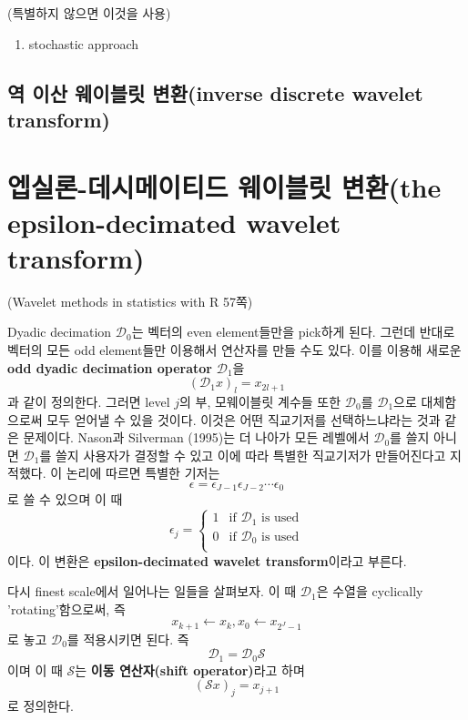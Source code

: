 \documentclass[b5paper,]{scrbook}
\providecommand{\tightlist}{%
  \setlength{\itemsep}{0pt}\setlength{\parskip}{0pt}}
\theoremstyle{plain}
\theoremstyle{definition}
\numberwithin{equation}{section}
\begin{document}
(특별하지 않으면 이것을 사용)

\begin{enumerate}
\def\labelenumi{\arabic{enumi}.}
\setcounter{enumi}{1}
\tightlist
\item
  stochastic approach
\end{enumerate}

\hypertarget{---inverse-discrete-wavelet-transform}{%
\subsection{역 이산 웨이블릿 변환(inverse discrete wavelet transform)}\label{---inverse-discrete-wavelet-transform}}

\hypertarget{---the-epsilon-decimated-wavelet-transform}{%
\section{엡실론-데시메이티드 웨이블릿 변환(the epsilon-decimated wavelet transform)}\label{---the-epsilon-decimated-wavelet-transform}}

(Wavelet methods in statistics with R 57쪽)

Dyadic decimation \(\mathcal{D}_{0}\)는 벡터의 even element들만을 pick하게 된다. 그런데 반대로 벡터의 모든 odd element들만 이용해서 연산자를 만들 수도 있다. 이를 이용해 새로운 \textbf{odd dyadic decimation operator} \(\mathcal{D}_{1}\)을
\[(\mathcal{D}_{1}x)_{l}=x_{2l+1}\]
과 같이 정의한다. 그러면 level \(j\)의 부, 모웨이블릿 계수들 또한 \(\mathcal{D}_{0}\)를 \(\mathcal{D}_{1}\)으로 대체함으로써 모두 얻어낼 수 있을 것이다. 이것은 어떤 직교기저를 선택하느냐라는 것과 같은 문제이다. Nason과 Silverman (1995)는 더 나아가 모든 레벨에서 \(\mathcal{D}_{0}\)를 쓸지 아니면 \(\mathcal{D}_{1}\)를 쓸지 사용자가 결정할 수 있고 이에 따라 특별한 직교기저가 만들어진다고 지적했다. 이 논리에 따르면 특별한 기저는
\[\epsilon=\epsilon_{J-1}\epsilon_{J-2}\cdots\epsilon_{0}\]
로 쓸 수 있으며 이 때
\[
\epsilon_{j} = 
\begin{cases}
1 & \text{if $\mathcal{D}_{1}$ is used} \\
0 & \text{if $\mathcal{D}_{0}$ is used}\\
\end{cases}
\]
이다. 이 변환은 \textbf{epsilon-decimated wavelet transform}이라고 부른다.

다시 finest scale에서 일어나는 일들을 살펴보자. 이 때 \(\mathcal{D}_{1}\)은 수열을 cyclically 'rotating'함으로써, 즉
\[x_{k+1} \leftarrow x_{k}, x_{0} \leftarrow x_{2^{J}-1}\]
로 놓고 \(\mathcal{D}_{0}\)를 적용시키면 된다. 즉
\[\mathcal{D}_{1}=\mathcal{D}_{0}\mathcal{S}\]
이며 이 때 \(\mathcal{S}\)는 \textbf{이동 연산자(shift operator)}라고 하며
\[(\mathcal{S}x)_{j}=x_{j+1}\]
로 정의한다.
\end{document}
